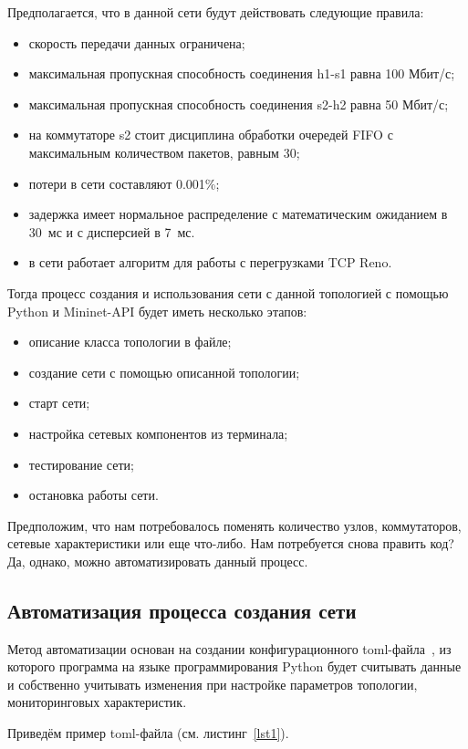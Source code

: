 \documentclass[60x84/16,8pt]{ittmm}
\begin{document}
Предполагается, что в данной сети будут действовать следующие правила:
\begin{itemize}
\item скорость передачи данных ограничена;
\item максимальная пропускная способность соединения h1-s1 равна 100
  Мбит/с;
\item максимальная пропускная способность соединения s2-h2 равна 50
  Мбит/с;
\item на коммутаторе s2 стоит дисциплина обработки очередей FIFO с
  максимальным количеством пакетов, равным 30;
\item потери в сети составляют 0.001\%;
\item задержка имеет нормальное распределение с математическим
  ожиданием в 30~мс и с дисперсией в 7~мс.
\item в сети работает алгоритм для работы с перегрузками TCP Reno.
\end{itemize}

Тогда процесс создания и использования сети с данной топологией с
помощью Python и Mininet-API будет иметь несколько этапов:
\begin{itemize}
\item описание класса топологии в файле;
\item создание сети с помощью описанной топологии;
\item старт сети;
\item настройка сетевых компонентов из терминала;
\item тестирование  сети;
\item остановка работы сети.
\end{itemize}

Предположим, что нам потребовалось поменять количество узлов,
коммутаторов, сетевые характеристики или еще что-либо. Нам потребуется
снова править код? Да, однако, можно автоматизировать данный процесс.


\subsection{Автоматизация процесса создания сети}

Метод автоматизации основан на создании конфигурационного
toml-файла~\cite{toml}, из которого программа на языке
программирования Python будет считывать данные и собственно учитывать
изменения при настройке параметров топологии, мониторинговых
характеристик.

Приведём пример  toml-файла (см. листинг~\ref{lst1}).
\end{document}
